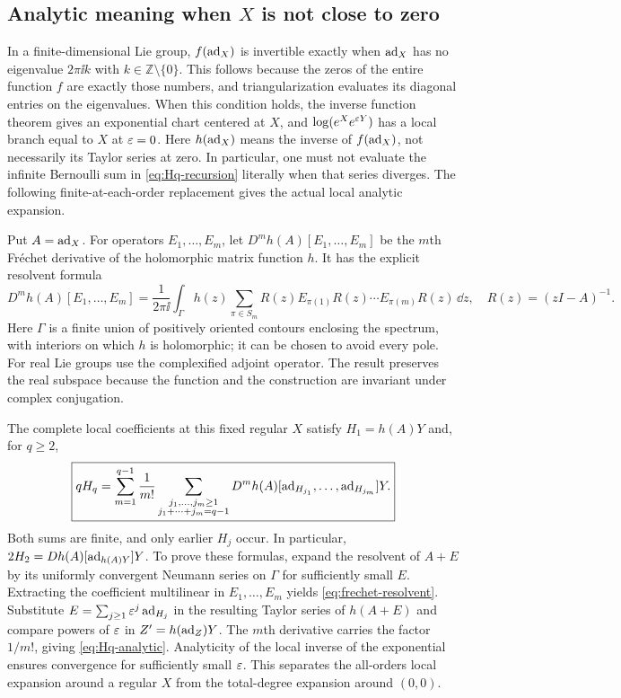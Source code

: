 \subsection{Analytic meaning when \texorpdfstring{$X$}{X} is not close to zero}
In a finite-dimensional Lie group, $f(\operatorname{ad}_X)$ is invertible exactly when $\operatorname{ad}_X$ has no eigenvalue $2\pi\ii k$ with $k\in\mathbb Z\setminus\{0\}$. This follows because the zeros of the entire function $f$ are exactly those numbers, and triangularization evaluates its diagonal entries on the eigenvalues. When this condition holds, the inverse function theorem gives an exponential chart centered at $X$, and $\log(e^Xe^{\varepsilon Y})$ has a local branch equal to $X$ at $\varepsilon=0$. Here $h(\operatorname{ad}_X)$ means the inverse of $f(\operatorname{ad}_X)$, not necessarily its Taylor series at zero. In particular, one must not evaluate the infinite Bernoulli sum in \cref{eq:Hq-recursion} literally when that series diverges. The following finite-at-each-order replacement gives the actual local analytic expansion.

Put $A=\operatorname{ad}_X$. For operators $E_1,\ldots,E_m$, let $D^mh(A)[E_1,\ldots,E_m]$ be the $m$th Fr\'echet derivative of the holomorphic matrix function $h$. It has the explicit resolvent formula
\begin{equation}\label{eq:frechet-resolvent}
 D^mh(A)[E_1,\ldots,E_m]
 =\frac1{2\pi\ii}\int_\Gamma h(z)
 \sum_{\pi\in S_m}R(z)E_{\pi(1)}R(z)\cdots E_{\pi(m)}R(z)\,\dd z,
 \quad R(z)=(zI-A)^{-1}.
\end{equation}
Here $\Gamma$ is a finite union of positively oriented contours enclosing the spectrum, with interiors on which $h$ is holomorphic; it can be chosen to avoid every pole. For real Lie groups use the complexified adjoint operator. The result preserves the real subspace because the function and the construction are invariant under complex conjugation.

The complete local coefficients at this fixed regular $X$ satisfy $H_1=h(A)Y$ and, for $q\geq2$,
\begin{equation}\label{eq:Hq-analytic}
 \boxed{\displaystyle
 qH_q=\sum_{m=1}^{q-1}\frac1{m!}
 \sum_{\substack{j_1,\ldots,j_m\geq1\\j_1+\cdots+j_m=q-1}}
 D^mh(A)[\operatorname{ad}_{H_{j_1}},\ldots,\operatorname{ad}_{H_{j_m}}]Y.}
\end{equation}
Both sums are finite, and only earlier $H_j$ occur. In particular,
$2H_2=Dh(A)[\operatorname{ad}_{h(A)Y}]Y$.
To prove these formulas, expand the resolvent of $A+E$ by its uniformly convergent Neumann series on $\Gamma$ for sufficiently small $E$. Extracting the coefficient multilinear in $E_1,\ldots,E_m$ yields \cref{eq:frechet-resolvent}. Substitute
$E=\sum_{j\geq1}\varepsilon^j\operatorname{ad}_{H_j}$ in the resulting Taylor series of $h(A+E)$ and compare powers of $\varepsilon$ in $Z'=h(\operatorname{ad}_Z)Y$. The $m$th derivative carries the factor $1/m!$, giving \cref{eq:Hq-analytic}. Analyticity of the local inverse of the exponential ensures convergence for sufficiently small $\varepsilon$. This separates the all-orders local expansion around a regular $X$ from the total-degree expansion around $(0,0)$.
